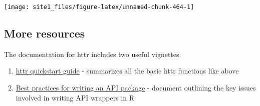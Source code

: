 \documentclass[]{book}
\newenvironment{Shaded}{\begin{snugshade}}{\end{snugshade}}
\newcommand{\KeywordTok}[1]{\textcolor[rgb]{0.13,0.29,0.53}{\textbf{#1}}}
\newcommand{\DataTypeTok}[1]{\textcolor[rgb]{0.13,0.29,0.53}{#1}}
\newcommand{\DecValTok}[1]{\textcolor[rgb]{0.00,0.00,0.81}{#1}}
\newcommand{\StringTok}[1]{\textcolor[rgb]{0.31,0.60,0.02}{#1}}
\newcommand{\CommentTok}[1]{\textcolor[rgb]{0.56,0.35,0.01}{\textit{#1}}}
\newcommand{\OperatorTok}[1]{\textcolor[rgb]{0.81,0.36,0.00}{\textbf{#1}}}
\newcommand{\NormalTok}[1]{#1}
\providecommand{\tightlist}{%
  \setlength{\itemsep}{0pt}\setlength{\parskip}{0pt}}
\begin{document}
\begin{Shaded}
\end{Shaded}

\begin{center}\texttt{[image: site1\_files/figure-latex/unnamed-chunk-464-1]} \end{center}

\subsection{More resources}\label{more-resources-1}

The documentation for httr includes two useful vignettes:

\begin{enumerate}
\def\labelenumi{\arabic{enumi}.}
\tightlist
\item
  \href{https://cran.r-project.org/web/packages/httr/vignettes/quickstart.html}{httr
  quickstart guide} - summarizes all the basic httr functions like above
\item
  \href{https://cran.r-project.org/web/packages/httr/vignettes/api-packages.html}{Best
  practices for writing an API package} - document outlining the key
  issues involved in writing API wrappers in R
\end{enumerate}
\end{document}
